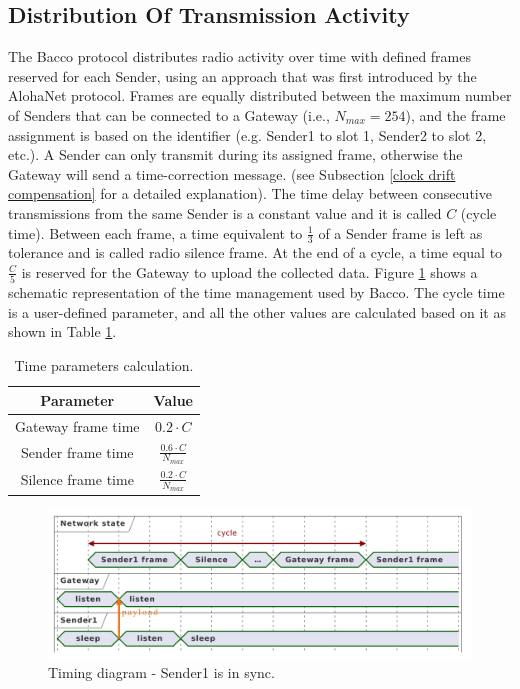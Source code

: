 \subsection{Distribution Of Transmission Activity}
The Bacco protocol distributes radio activity over time with defined frames reserved for each Sender, using
an approach that was first introduced by the AlohaNet \cite{alohanet} protocol. Frames are equally distributed between
the maximum number of Senders that can be connected to a Gateway (i.e., $N_{max} = 254$), and the frame assignment is based on
the identifier (e.g. Sender1 to slot 1, Sender2 to slot 2, etc.). A Sender can only transmit during its assigned frame,
otherwise the Gateway will send a time-correction message. (see Subsection \ref{clock drift compensation} for a detailed
explanation). The time delay between consecutive transmissions from the same Sender is a constant value and it is called
$C$ (cycle time). Between each frame, a time equivalent to $\frac{1}{3}$ of a Sender frame is left as tolerance and is
called radio silence frame. At the end of a cycle, a time equal to $\frac{C}{5}$ is reserved for the Gateway to upload
the collected data. Figure \ref{timing diagram case 1} shows a schematic representation of the time management used by
Bacco. The cycle time is a user-defined parameter, and all the other values are calculated based on it as shown in Table
\ref{timing table}.\\

\begin{table}[ht]
    \caption{Time parameters calculation.}
    \label{timing table}
    \centering
    \setlength{\extrarowheight}{7pt}
    \begin{tabular}{ |c|c| }
        \hline
        \textbf{Parameter} & \textbf{Value}\\
        \hline
        Gateway frame time & $0.2 \cdot C$\\
        Sender frame time & $\frac{0.6 \cdot C}{N_{max}}$\\
        Silence frame time & $\frac{0.2 \cdot C}{N_{max}}$\\
        \hline
    \end{tabular}
\end{table}

\begin{figure}[ht]
    \centering
    \includegraphics[width=1.0\textwidth]{uml/timings_case1.pdf}
    \caption{Timing diagram - Sender1 is in sync.}
    \label{timing diagram case 1}
\end{figure}

